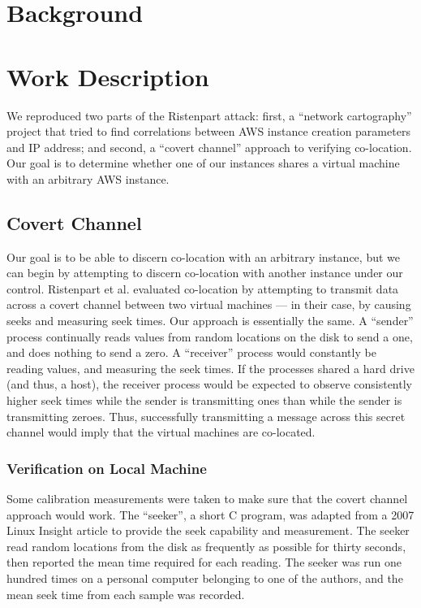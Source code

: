 \documentclass[conference]{IEEEtran}
\begin{document}
\section{Background}\label{sec:background}



\section{Work Description}
We reproduced two parts of the Ristenpart attack: first, a ``network cartography'' project that tried to find
  correlations between AWS instance creation parameters and IP address; and second, a ``covert channel'' approach to
  verifying co-location.
Our goal is to determine whether one of our instances shares a virtual machine with an arbitrary AWS instance.

\subsection{Covert Channel}
Our goal is to be able to discern co-location with an arbitrary instance, but we can begin by attempting to discern
  co-location with another instance under our control.
Ristenpart et al. evaluated co-location by attempting to transmit data across a covert channel between two virtual
  machines --- in their case, by causing seeks and measuring seek times. Our approach is essentially the same.
A ``sender'' process continually reads values from random locations on the disk to send a one, and does nothing to
  send a zero.
A ``receiver'' process would constantly be reading values, and measuring the seek times.
If the processes shared a hard drive (and thus, a host), the receiver process would be expected to observe consistently
  higher seek times while the sender is transmitting ones than while the sender is transmitting zeroes.
Thus, successfully transmitting a message across this secret channel would imply that the virtual machines are
  co-located.

\subsubsection{Verification on Local Machine}
Some calibration measurements were taken to make sure that the covert channel approach would work.
The ``seeker'', a short C program, was adapted from a 2007 Linux Insight article \cite{seeker07} to provide the seek
  capability and measurement.
The seeker read random locations from the disk as frequently as possible for thirty seconds, then reported the mean
  time required for each reading.
The seeker was run one hundred times on a personal computer belonging to one of the authors, and the mean seek time
  from each sample was recorded.
\end{document}
